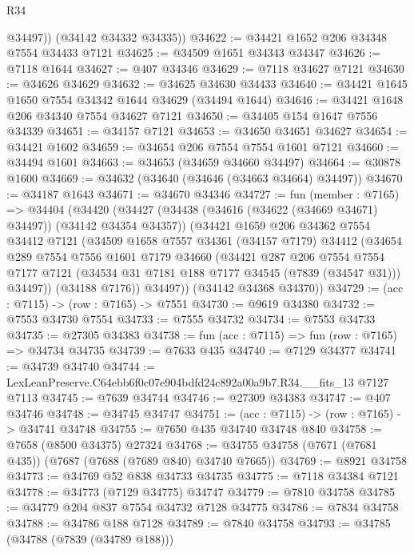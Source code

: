 \begin{lexlean}{R34}
\begin{coremodule}
          @34497))
      (@34142 @34332 @34335))
@34622 := @34421 @1652 @206 @34348 @7554 @34433 @7121
@34625 := @34509 @1651 @34343 @34347
@34626 := @7118 @1644
@34627 := @407 @34346
@34629 := @7118 @34627 @7121
@34630 := @34626 @34629
@34632 := @34625 @34630 @34433
@34640 := @34421 @1645 @1650 @7554 @34342 @1644 @34629 (@34494 @1644)
@34646 := @34421 @1648 @206 @34340 @7554 @34627 @7121
@34650 := @34405 @154 @1647 @7556 @34339
@34651 := @34157 @7121
@34653 := @34650 @34651 @34627
@34654 := @34421 @1602
@34659 := @34654 @206 @7554 @7554 @1601 @7121
@34660 := @34494 @1601
@34663 := @34653 (@34659 @34660 @34497)
@34664 := @30878 @1600
@34669 := @34632 (@34640 (@34646 (@34663 @34664) @34497))
@34670 := @34187 @1643
@34671 := @34670 @34346
@34727 := fun (member : @7165) =>
  @34404
    (@34420
      (@34427
        (@34438 (@34616 (@34622 (@34669 @34671) @34497)) (@34142 @34354 @34357))
        (@34421
          @1659
          @206
          @34362
          @7554
          @34412
          @7121
          (@34509
            @1658
            @7557
            @34361
            (@34157 @7179)
            @34412
            (@34654
              @289
              @7554
              @7556
              @1601
              @7179
              @34660
              (@34421
                @287
                @206
                @7554
                @7554
                @7177
                @7121
                (@34534 @31 @7181 @188 @7177 @34545 (@7839 (@34547 @31)))
                @34497))
            (@34188 @7176))
          @34497))
      (@34142 @34368 @34370))
@34729 := (acc : @7115) -> (row : @7165) -> @7551
@34730 := @9619 @34380
@34732 := @7553 @34730 @7554
@34733 := @7555 @34732
@34734 := @7553 @34733
@34735 := @27305 @34383
@34738 := fun (acc : @7115) => fun (row : @7165) => @34734 @34735
@34739 := @7633 @435
@34740 := @7129 @34377
@34741 := @34739 @34740
@34744 := LexLeanPreserve.C64ebb6f0c07e904bdfd24c892a00a9b7.R34.__fits_13 @7127 @7113
@34745 := @7639 @34744
@34746 := @27309 @34383
@34747 := @407 @34746
@34748 := @34745 @34747
@34751 := (acc : @7115) -> (row : @7165) -> @34741 @34748
@34755 := @7650 @435 @34740 @34748 @840
@34758 := @7658 (@8500 @34375) @27324
@34768 := @34755 @34758 (@7671 (@7681 @435)) (@7687 (@7688 (@7689 @840) @34740 @7665))
@34769 := @8921 @34758
@34773 := @34769 @52 @838 @34733 @34735
@34775 := @7118 @34384 @7121
@34778 := @34773 (@7129 @34775) @34747
@34779 := @7810 @34758
@34785 := @34779 @204 @837 @7554 @34732 @7128 @34775
@34786 := @7834 @34758
@34788 := @34786 @188 @7128
@34789 := @7840 @34758
@34793 := @34785 (@34788 (@7839 (@34789 @188)))

\end{coremodule}
\end{lexlean}
